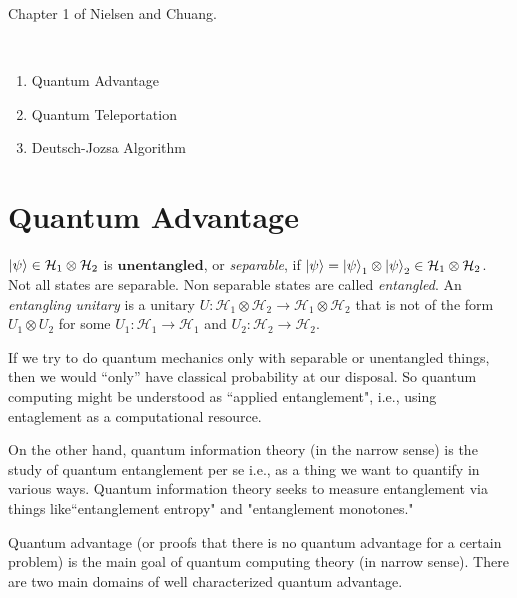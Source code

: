 \documentclass{article}
\begin{document}
    

\noindent
{}

\vspace{.3cm}

 Chapter 1 of Nielsen and Chuang. 

\

\begin{enumerate}
     \item Quantum Advantage
     \item Quantum Teleportation
     \item Deutsch-Jozsa Algorithm
\end{enumerate}

\section{Quantum Advantage}

$\ket \psi \in \mathcal{H}_1 \otimes \mathcal{H}_2$ is $\mathbf{unentangled}$, or \emph{separable}, if $\ket \psi = \ket \psi_1 \otimes \ket \psi_2 \in \mathcal{H}_1 \otimes \mathcal{H}_2$. Not all states are separable. Non separable states are called \emph{entangled}.
An \emph{entangling unitary} is a unitary $U: \mathcal{H}_1 \otimes \mathcal{H}_2 \rightarrow \mathcal{H}_1 \otimes \mathcal{H}_2$ that is not of the form $U_1 \otimes U_2$ for some $U_1: \mathcal{H}_1 \to \mathcal{H}_1$ and $U_2: \mathcal{H}_2 \to \mathcal{H}_2$.

If we try to do quantum mechanics only with separable or unentangled things, then we would ``only'' have classical probability at our disposal.  So quantum computing might be understood as ``applied entanglement", i.e., using entaglement as a computational resource.

On the other hand, quantum information theory (in the narrow sense) is the study of quantum entanglement per se i.e., as a thing we want to quantify in various ways. Quantum information theory seeks to measure entanglement via things like``entanglement entropy" and "entanglement monotones."

Quantum advantage (or proofs that there is no quantum advantage for a certain problem) is the main goal of quantum computing theory (in narrow sense). There are two main domains of well characterized quantum advantage.
\end{document}
